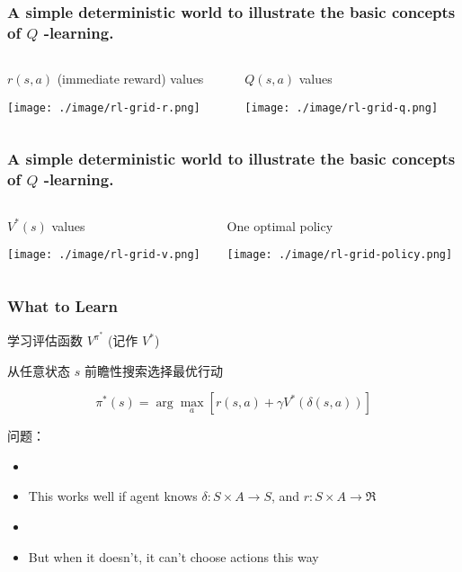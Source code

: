 \documentclass{beamer}
\begin{document}
\begin{frame}
\frametitle{A simple deterministic world to illustrate the basic concepts of $Q$ -learning.}
\label{sec-2-4}
\begin{columns}
\begin{column}{0.5\textwidth}
\begin{block}{$r(s,a)$ (immediate reward) values}
\label{sec-2-4-1}


\texttt{[image: ./image/rl-grid-r.png]}
\end{block}
\end{column}
\begin{column}{0.5\textwidth}
\begin{block}{$Q(s,a)$ values}
\label{sec-2-4-2}


\texttt{[image: ./image/rl-grid-q.png]}
\end{block}
\end{column}
\end{columns}
\end{frame}
\begin{frame}
\frametitle{A simple deterministic world to illustrate the basic concepts of $Q$ -learning.}
\label{sec-2-5}
\begin{columns}
\begin{column}{0.5\textwidth}
\begin{block}{$V^{*}(s)$ values}
\label{sec-2-5-1}



\texttt{[image: ./image/rl-grid-v.png]}
\end{block}
\end{column}
\begin{column}{0.5\textwidth}
\begin{block}{One optimal policy}
\label{sec-2-5-2}


\texttt{[image: ./image/rl-grid-policy.png]}
\end{block}
\end{column}
\end{columns}
\end{frame}
\begin{frame}
\frametitle{What to Learn}
\label{sec-2-6}

学习评估函数 $V^{\pi^{*}}$ (记作 $V^*$)


从任意状态 $s$ 前瞻性搜索选择最优行动

\[ \pi^{*}(s) = \arg\max_{a} [r(s,a) + \gamma V^{*}(\delta(s,a))] \]

问题：
\begin{itemize}
\item \item This works well if agent knows $\delta: S \times A \rightarrow S$, and $r : S \times A \rightarrow \Re$
\item \item But when it doesn't, it can't choose actions this way
\end{itemize}
\end{frame}
\end{document}
